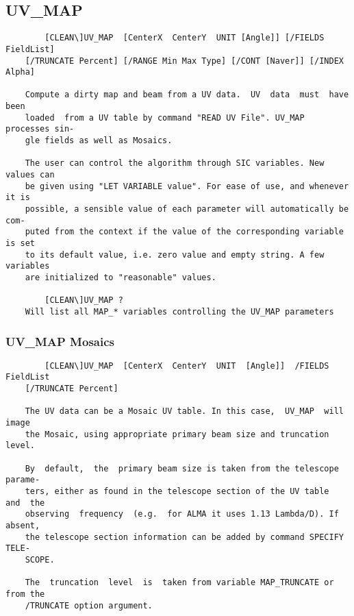 \subsection{UV\_MAP}
\begin{verbatim}
        [CLEAN\]UV_MAP  [CenterX  CenterY  UNIT [Angle]] [/FIELDS FieldList]
    [/TRUNCATE Percent] [/RANGE Min Max Type] [/CONT [Naver]] [/INDEX Alpha]

    Compute a dirty map and beam from a UV data.  UV  data  must  have  been
    loaded  from a UV table by command "READ UV File". UV_MAP processes sin-
    gle fields as well as Mosaics.

    The user can control the algorithm through SIC variables. New values can
    be given using "LET VARIABLE value". For ease of use, and whenever it is
    possible, a sensible value of each parameter will automatically be  com-
    puted from the context if the value of the corresponding variable is set
    to its default value, i.e. zero value and empty string. A few  variables
    are initialized to "reasonable" values.

        [CLEAN\]UV_MAP ?
    Will list all MAP_* variables controlling the UV_MAP parameters

\end{verbatim}
\subsubsection{UV\_MAP Mosaics}
\begin{verbatim}
        [CLEAN\]UV_MAP  [CenterX  CenterY  UNIT  [Angle]]  /FIELDS FieldList
    [/TRUNCATE Percent]

    The UV data can be a Mosaic UV table. In this case,  UV_MAP  will  image
    the Mosaic, using appropriate primary beam size and truncation level.

    By  default,  the  primary beam size is taken from the telescope parame-
    ters, either as found in the telescope section of the UV table  and  the
    observing  frequency  (e.g.  for ALMA it uses 1.13 Lambda/D). If absent,
    the telescope section information can be added by command SPECIFY  TELE-
    SCOPE.

    The  truncation  level  is  taken from variable MAP_TRUNCATE or from the
    /TRUNCATE option argument.

\end{verbatim}
